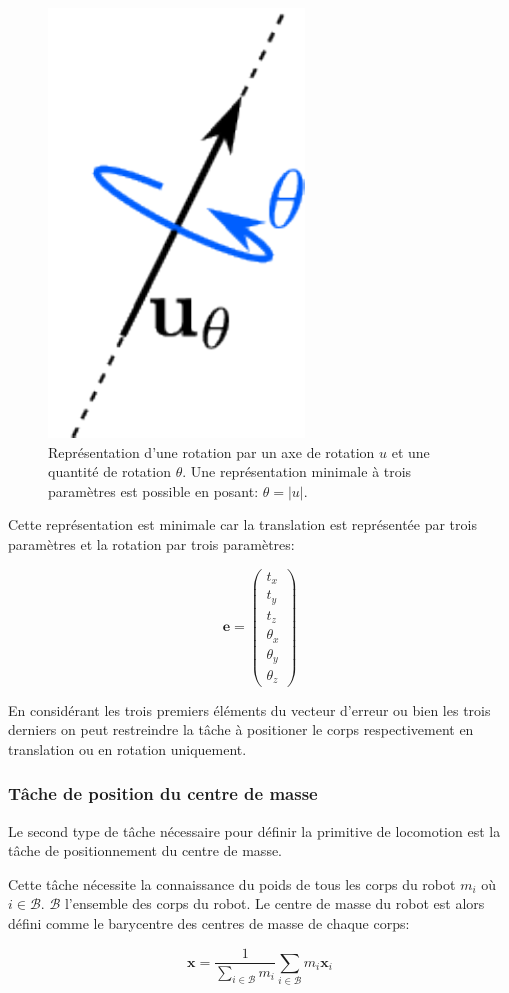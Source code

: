 \begin{figure}
  \begin{center}
    \includegraphics[width=.1\linewidth]{src/chap3-primitive-mouvement/utheta.pdf}
  \end{center}
  \caption{Représentation d'une rotation par un axe de rotation $u$ et
    une quantité de rotation $\theta$. Une représentation minimale à
    trois paramètres est possible en posant: $\theta = |u|$.}
\end{figure}


Cette représentation est minimale car la translation est représentée
par trois paramètres et la rotation par trois paramètres:

\begin{equation}
  \mathbf{e} = \left(
  \begin{array}{c}
    t_x\\
    t_y\\
    t_z\\
    \theta_x\\
    \theta_y\\
    \theta_z
  \end{array}
  \right)
\end{equation}

En considérant les trois premiers éléments du vecteur d'erreur ou bien
les trois derniers on peut restreindre la tâche à positioner le corps
respectivement en translation ou en rotation uniquement.


\subsubsection{Tâche de position du centre de masse}


Le second type de tâche nécessaire pour définir la primitive de
locomotion est la tâche de positionnement du centre de masse.

Cette tâche nécessite la connaissance du poids de tous les corps du
robot $m_i$ où $i \in \mathcal{B}$. $\mathcal{B}$ l'ensemble des corps
du robot. Le centre de masse du robot est alors défini comme le
barycentre des centres de masse de chaque corps:

\begin{equation}
  \mathbf{x} = \frac{1}{\sum_{i \in \mathcal{B}} m_i} \sum_{i \in \mathcal{B}} m_i \mathbf{x}_i
\end{equation}


